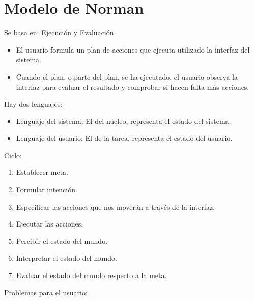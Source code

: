 \documentclass[12pt, twoside, openright]{report} %
\begin{document}
\section{Modelo de Norman}
\vspace{-0.5cm}
    Se basa en: Ejecución y Evaluación.

    \begin{itemize}
    
    \item
      El usuario formula un plan de acciones que ejecuta utilizado la
      interfaz del sistema.
    \item
      Cuando el plan, o parte del plan, se ha ejecutado, el usuario
      observa la interfaz para evaluar el resultado y comprobar si hacen
      falta más acciones.
    \end{itemize}
\pagebreak

	Hay dos lenguajes:
	\vspace{-0.5cm}

    \begin{itemize}
    
    \item
      Lenguaje del sistema: El del núcleo, representa el estado del
      sistema.
    \item
      Lenguaje del usuario: El de la tarea, representa el estado del
      usuario.
    \end{itemize}

	Ciclo:
	\vspace{-0.5cm}

    \begin{enumerate}
    \def\labelenumi{\arabic{enumi}.}
    
    \item
      Establecer meta.
    \item
      Formular intención.
    \item
      Especificar las acciones que nos moverán a través de la interfaz.
    \item
      Ejecutar las acciones.
    \item
      Percibir el estado del mundo.
    \item
      Interpretar el estado del mundo.
    \item
      Evaluar el estado del mundo respecto a la meta.
    \end{enumerate}

	Problemas para el usuario:
\end{document}
